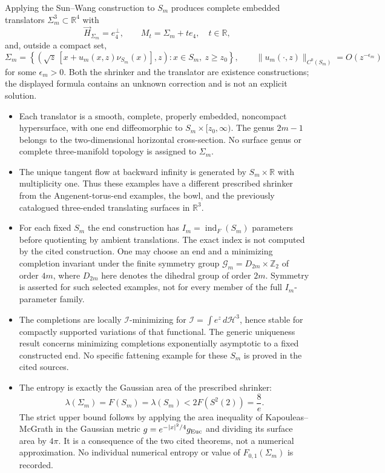 \begin{example}
Applying the Sun--Wang construction to $S_m$ produces complete embedded translators $\Sigma_m^3\subset\mathbb R^4$ with
\[
 \vec H_{\Sigma_m}=e_4^\perp,\qquad
 M_t=\Sigma_m+t e_4,\quad t\in\mathbb R,
\]
and, outside a compact set,
\[
 \Sigma_m=
 \left\{\left(\sqrt z\,[x+u_m(x,z)\nu_{S_m}(x)],z\right):
 x\in S_m,\ z\geq z_0\right\},\qquad
 \|u_m(\cdot,z)\|_{C^0(S_m)}=O(z^{-\epsilon_m})
\]
for some $\epsilon_m>0$. Both the shrinker and the translator are existence constructions; the displayed formula contains an unknown correction and is not an explicit solution.
\begin{itemize}
\item Each translator is a smooth, complete, properly embedded, noncompact hypersurface, with one end diffeomorphic to $S_m\times[z_0,\infty)$. The genus $2m-1$ belongs to the two-dimensional horizontal cross-section. No surface genus or complete three-manifold topology is assigned to $\Sigma_m$.
\item The unique tangent flow at backward infinity is generated by $S_m\times\mathbb R$ with multiplicity one. Thus these examples have a different prescribed shrinker from the Angenent-torus-end examples, the bowl, and the previously catalogued three-ended translating surfaces in $\mathbb R^3$.
\item For each fixed $S_m$ the end construction has $I_m=\operatorname{ind}_F(S_m)$ parameters before quotienting by ambient translations. The exact index is not computed by the cited construction. One may choose an end and a minimizing completion invariant under the finite symmetry group $\mathcal G_m=D_{2m}\times\mathbb Z_2$ of order $4m$, where $D_{2m}$ here denotes the dihedral group of order $2m$. Symmetry is asserted for such selected examples, not for every member of the full $I_m$-parameter family.
\item The completions are locally $\mathcal I$-minimizing for $\mathcal I=\int e^z\,d\mathcal H^3$, hence stable for compactly supported variations of that functional. The generic uniqueness result concerns minimizing completions exponentially asymptotic to a fixed constructed end. No specific fattening example for these $S_m$ is proved in the cited sources.
\item The entropy is exactly the Gaussian area of the prescribed shrinker:
\[
 \lambda(\Sigma_m)=F(S_m)=\lambda(S_m)<2F(S^2(2))=\frac8e.
\]
The strict upper bound follows by applying the area inequality of Kapouleas--McGrath in the Gaussian metric $g=e^{-|x|^2/4}g_{\rm Euc}$ and dividing its surface area by $4\pi$. It is a consequence of the two cited theorems, not a numerical approximation. No individual numerical entropy or value of $F_{0,1}(\Sigma_m)$ is recorded.

\end{itemize}
\end{example}
